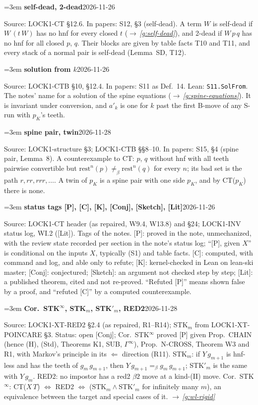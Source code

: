 \documentclass[11pt]{amsart}
\makeatletter
\newcommand{\conv}{=_\beta}
\newcommand{\rest}{\mathrm{rest}}
\newcounter{sense}
\newenvironment{entry}[3]{%
  \par\addvspace{\medskipamount}\noindent\phantomsection
  \def\@currentlabel{#2}\label{#1}\setcounter{sense}{0}\raggedright\emergencystretch=3em%
  \textbf{#2}\hfill{\footnotesize\textsf{#3}}\par\nopagebreak\noindent\ignorespaces}%
  {\par}
\newcommand{\src}[1]{\textsf{Source:} #1.\enskip}
\newcommand{\lean}[1]{\textsf{Lean:} #1.\enskip}
\newcommand{\status}[1]{\textsf{Status:} #1.\enskip}
\newcommand{\appears}[1]{\textsf{In papers:} #1.\enskip}
\renewcommand{\see}[1]{$\rightarrow$\,\emph{\ref{#1}}}
\makeatother
\begin{document}
\begin{entry}{g:wl-self-dead}{self-dead, 2-dead}{2026-11-26}
\src{LOCK1-CT \S12.6}
\appears{S12, \S3 (self-dead)}
A term $W$ is self-dead if $W\,(t\,W)$ has no hnf for every closed $t$ (\see{g:self-dead}), and 2-dead
if $W\,p\,q$ has no hnf for all closed $p$, $q$. Their blocks are given by table facts T10 and T11, and
every stack of a normal pair is self-dead (Lemma~SD, T12).
\end{entry}

\begin{entry}{g:wl-solution}{solution from $k$}{2026-11-26}
\src{LOCK1-CTB \S10, \S12.4}
\appears{S11 as Def.~14}
\lean{\texttt{S11.SolFrom}}
The notes' name for a solution of the spine equations (\see{g:spine-equations}). It is invariant under
conversion, and $a'_k$ is one for $k$ past the first B-move of any S-run with $p_K$'s teeth.
\end{entry}

\begin{entry}{g:wl-spine-pair}{spine pair, twin}{2026-11-28}
\src{LOCK1-structure \S3; LOCK1-CTB \S\S8--10}
\appears{S15, \S4 (spine pair, Lemma~8)}
A counterexample to CT: $p$, $q$ without hnf with all teeth pairwise convertible but $\rest^n(p)
\not\conv\rest^n(q)$ for every $n$; its bad set is the path $r,rr,rrr,\dots$. A twin of $p_K$ is a spine
pair with one side $p_K$, and by CT($p_K$) there is none.
\end{entry}

\begin{entry}{g:wl-status-tags}{status tags [P], [C], [K], [Conj], [Sketch], [Lit]}{2026-11-26}
\src{LOCK1-CT header (as repaired, W9.4, W13.8) and \S24; LOCK1-INV status log, WI.2 ([Lit])}
Tags of the notes. [P]: proved in the note, unmechanized, with the review state recorded per section
in the note's status log; ``[P], given $X$'' is conditional on the inputs $X$, typically (S1) and table
facts. [C]: computed, with command and log, and able only to refute; [K]: kernel-checked in Lean on
lean-ski master; [Conj]: conjectured; [Sketch]: an argument not checked step by step; [Lit]: a published theorem, cited and not re-proved. ``Refuted [P]''
means shown false by a proof, and ``refuted [C]'' by a computed counterexample.
\end{entry}

\begin{entry}{g:wl-stk}{Cor.~STK$^\infty$, STK$_m$, STK$'_m$, RED2}{2026-11-28}
\src{LOCK1-XT-RED2 \S2.4 (as repaired, R1--R14); STK$_m$ from LOCK1-XT-POINCARE \S3}
\status{open [Conj]; Cor.~STK$^\infty$ proved [P] given Prop.~CHAIN (hence (H), (Std), Theorems K1,
SUB, $\Gamma^\infty$), Prop.~N-CROSS, Theorem W3 and R1, with Markov's principle in its $\Leftarrow$
direction (R11)}
STK$_m$: if $Y\,g_{m+1}$ is hnf-less and has the teeth of $g_m\,g_{m+1}$, then $Y\,g_{m+1}\conv
g_m\,g_{m+1}$; STK$'_m$ is the same with $Y\,g_m$. RED2: no impostor has a red2 $\beta2$ move at a
kind-(II) move. Cor.~STK$^\infty$: CT($X\,T$) $\Leftrightarrow$ RED2 $\Leftrightarrow$ (STK$_m\wedge{}$STK$'_m$
for infinitely many $m$), an equivalence between the target and special cases of it. \see{g:wl-rigid}
\end{entry}
\end{document}
